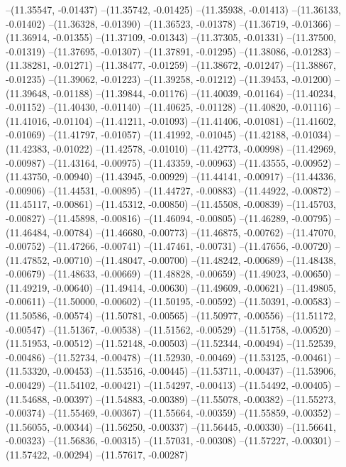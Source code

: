 --(11.35547, -0.01437)
--(11.35742, -0.01425)
--(11.35938, -0.01413)
--(11.36133, -0.01402)
--(11.36328, -0.01390)
--(11.36523, -0.01378)
--(11.36719, -0.01366)
--(11.36914, -0.01355)
--(11.37109, -0.01343)
--(11.37305, -0.01331)
--(11.37500, -0.01319)
--(11.37695, -0.01307)
--(11.37891, -0.01295)
--(11.38086, -0.01283)
--(11.38281, -0.01271)
--(11.38477, -0.01259)
--(11.38672, -0.01247)
--(11.38867, -0.01235)
--(11.39062, -0.01223)
--(11.39258, -0.01212)
--(11.39453, -0.01200)
--(11.39648, -0.01188)
--(11.39844, -0.01176)
--(11.40039, -0.01164)
--(11.40234, -0.01152)
--(11.40430, -0.01140)
--(11.40625, -0.01128)
--(11.40820, -0.01116)
--(11.41016, -0.01104)
--(11.41211, -0.01093)
--(11.41406, -0.01081)
--(11.41602, -0.01069)
--(11.41797, -0.01057)
--(11.41992, -0.01045)
--(11.42188, -0.01034)
--(11.42383, -0.01022)
--(11.42578, -0.01010)
--(11.42773, -0.00998)
--(11.42969, -0.00987)
--(11.43164, -0.00975)
--(11.43359, -0.00963)
--(11.43555, -0.00952)
--(11.43750, -0.00940)
--(11.43945, -0.00929)
--(11.44141, -0.00917)
--(11.44336, -0.00906)
--(11.44531, -0.00895)
--(11.44727, -0.00883)
--(11.44922, -0.00872)
--(11.45117, -0.00861)
--(11.45312, -0.00850)
--(11.45508, -0.00839)
--(11.45703, -0.00827)
--(11.45898, -0.00816)
--(11.46094, -0.00805)
--(11.46289, -0.00795)
--(11.46484, -0.00784)
--(11.46680, -0.00773)
--(11.46875, -0.00762)
--(11.47070, -0.00752)
--(11.47266, -0.00741)
--(11.47461, -0.00731)
--(11.47656, -0.00720)
--(11.47852, -0.00710)
--(11.48047, -0.00700)
--(11.48242, -0.00689)
--(11.48438, -0.00679)
--(11.48633, -0.00669)
--(11.48828, -0.00659)
--(11.49023, -0.00650)
--(11.49219, -0.00640)
--(11.49414, -0.00630)
--(11.49609, -0.00621)
--(11.49805, -0.00611)
--(11.50000, -0.00602)
--(11.50195, -0.00592)
--(11.50391, -0.00583)
--(11.50586, -0.00574)
--(11.50781, -0.00565)
--(11.50977, -0.00556)
--(11.51172, -0.00547)
--(11.51367, -0.00538)
--(11.51562, -0.00529)
--(11.51758, -0.00520)
--(11.51953, -0.00512)
--(11.52148, -0.00503)
--(11.52344, -0.00494)
--(11.52539, -0.00486)
--(11.52734, -0.00478)
--(11.52930, -0.00469)
--(11.53125, -0.00461)
--(11.53320, -0.00453)
--(11.53516, -0.00445)
--(11.53711, -0.00437)
--(11.53906, -0.00429)
--(11.54102, -0.00421)
--(11.54297, -0.00413)
--(11.54492, -0.00405)
--(11.54688, -0.00397)
--(11.54883, -0.00389)
--(11.55078, -0.00382)
--(11.55273, -0.00374)
--(11.55469, -0.00367)
--(11.55664, -0.00359)
--(11.55859, -0.00352)
--(11.56055, -0.00344)
--(11.56250, -0.00337)
--(11.56445, -0.00330)
--(11.56641, -0.00323)
--(11.56836, -0.00315)
--(11.57031, -0.00308)
--(11.57227, -0.00301)
--(11.57422, -0.00294)
--(11.57617, -0.00287)
